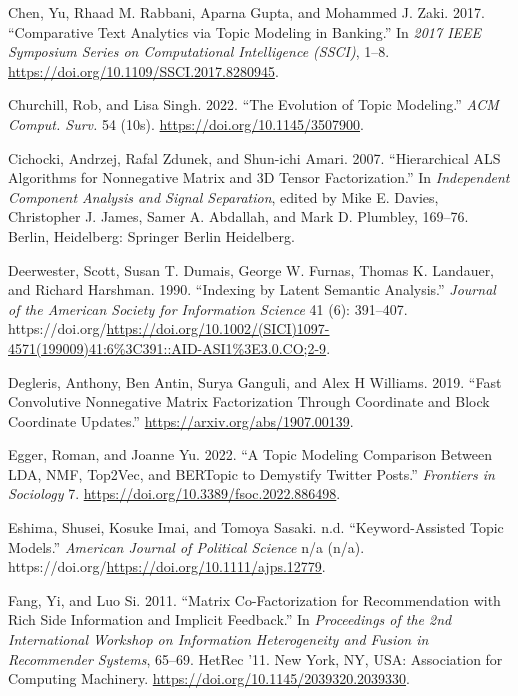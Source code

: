 \documentclass[
]{article}
\newlength{\cslhangindent}
\newlength{\cslentryspacingunit} %
\newenvironment{CSLReferences}[2] %
 {%
  \setlength{\parindent}{0pt}
  \ifodd #1
  \let\oldpar\par
  \def\par{\hangindent=\cslhangindent\oldpar}
  \fi
  \setlength{\parskip}{#2\cslentryspacingunit}
 }%
 {}
\begin{document}
\begin{CSLReferences}{1}{0}
\leavevmode{}%
Chen, Yu, Rhaad M. Rabbani, Aparna Gupta, and Mohammed J. Zaki. 2017. {``Comparative Text Analytics via Topic Modeling in Banking.''} In \emph{2017 IEEE Symposium Series on Computational Intelligence (SSCI)}, 1--8. \url{https://doi.org/10.1109/SSCI.2017.8280945}.

\leavevmode{}%
Churchill, Rob, and Lisa Singh. 2022. {``The Evolution of Topic Modeling.''} \emph{ACM Comput. Surv.} 54 (10s). \url{https://doi.org/10.1145/3507900}.

\leavevmode{}%
Cichocki, Andrzej, Rafal Zdunek, and Shun-ichi Amari. 2007. {``Hierarchical ALS Algorithms for Nonnegative Matrix and 3D Tensor Factorization.''} In \emph{Independent Component Analysis and Signal Separation}, edited by Mike E. Davies, Christopher J. James, Samer A. Abdallah, and Mark D. Plumbley, 169--76. Berlin, Heidelberg: Springer Berlin Heidelberg.

\leavevmode{}%
Deerwester, Scott, Susan T. Dumais, George W. Furnas, Thomas K. Landauer, and Richard Harshman. 1990. {``Indexing by Latent Semantic Analysis.''} \emph{Journal of the American Society for Information Science} 41 (6): 391--407. https://doi.org/\url{https://doi.org/10.1002/(SICI)1097-4571(199009)41:6\%3C391::AID-ASI1\%3E3.0.CO;2-9}.

\leavevmode{}%
Degleris, Anthony, Ben Antin, Surya Ganguli, and Alex H Williams. 2019. {``Fast Convolutive Nonnegative Matrix Factorization Through Coordinate and Block Coordinate Updates.''} \url{https://arxiv.org/abs/1907.00139}.

\leavevmode{}%
Egger, Roman, and Joanne Yu. 2022. {``A Topic Modeling Comparison Between LDA, NMF, Top2Vec, and BERTopic to Demystify Twitter Posts.''} \emph{Frontiers in Sociology} 7. \url{https://doi.org/10.3389/fsoc.2022.886498}.

\leavevmode{}%
Eshima, Shusei, Kosuke Imai, and Tomoya Sasaki. n.d. {``Keyword-Assisted Topic Models.''} \emph{American Journal of Political Science} n/a (n/a). https://doi.org/\url{https://doi.org/10.1111/ajps.12779}.

\leavevmode{}%
Fang, Yi, and Luo Si. 2011. {``Matrix Co-Factorization for Recommendation with Rich Side Information and Implicit Feedback.''} In \emph{Proceedings of the 2nd International Workshop on Information Heterogeneity and Fusion in Recommender Systems}, 65--69. HetRec '11. New York, NY, USA: Association for Computing Machinery. \url{https://doi.org/10.1145/2039320.2039330}.


\end{CSLReferences}
\end{document}
